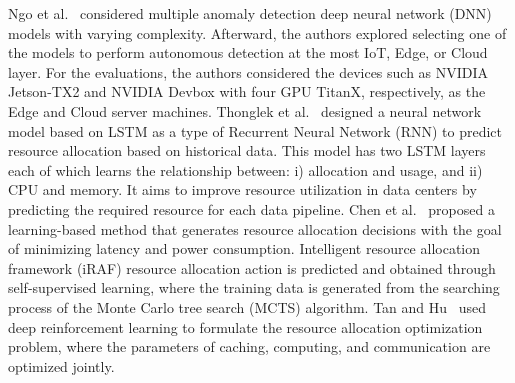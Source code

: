         Ngo et al.~\cite{ngo2020contextual} considered multiple anomaly detection deep neural network (DNN) models with varying complexity. Afterward, the authors explored selecting one of the models to perform autonomous detection at the most IoT, Edge, or Cloud layer. For the evaluations, the authors considered the devices such as NVIDIA Jetson-TX2 and NVIDIA Devbox with four GPU TitanX, respectively, as the Edge and Cloud server machines.
        Thonglek et al.~\cite{thonglek2019improving} designed a neural network model based on LSTM as a type of Recurrent Neural Network (RNN) to predict resource allocation based on historical data. This model has two LSTM layers each of which learns the relationship between: i) allocation and usage, and ii) CPU and memory. It aims to improve resource utilization in data centers by predicting the required resource for each data pipeline.
        Chen et al.~\cite{chen2019iraf,chen2020intelligent} proposed a learning-based method that generates resource allocation decisions with the goal of minimizing latency and power consumption. Intelligent resource allocation framework (iRAF) resource allocation action is predicted and obtained through self-supervised learning, where the training data is generated from the searching process of the Monte Carlo tree search (MCTS) algorithm.
        Tan and Hu~\cite{hu2018mobility} used deep reinforcement learning to formulate the resource allocation optimization problem, where the parameters of caching, computing, and communication are optimized jointly.


    


            